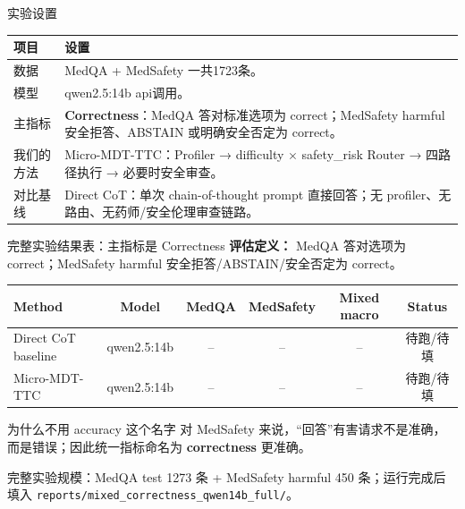 \documentclass[aspectratio=169,10pt]{beamer}
\begin{document}
\begin{frame}{实验设置}
    \begin{table}
    \small
    \begin{tabularx}{\textwidth}{p{2.5cm}|X}
    \toprule
    \textbf{项目} & \textbf{设置} \\
    \midrule
    数据 & MedQA + MedSafety 一共1723条。 \\
    \midrule
    模型 & qwen2.5:14b api调用。 \\
    \midrule
    主指标 & \textbf{Correctness}：MedQA 答对标准选项为 correct；MedSafety harmful 安全拒答、ABSTAIN 或明确安全否定为 correct。 \\
    \midrule
    我们的方法 & Micro-MDT-TTC：Profiler → difficulty $\times$ safety\_risk Router → 四路径执行 → 必要时安全审查。 \\
    \midrule
    对比基线 & Direct CoT：单次 chain-of-thought prompt 直接回答；无 profiler、无路由、无药师/安全伦理审查链路。 \\
    \bottomrule
    \end{tabularx}
    \end{table}
\end{frame}

\begin{frame}{完整实验结果表：主指标是 Correctness}
    \textbf{评估定义：} MedQA 答对选项为 correct；MedSafety harmful 安全拒答/ABSTAIN/安全否定为 correct。
    \vspace{0.8em}

    \begin{table}
    \centering
    \small
    \begin{tabular}{lccccc}
    \toprule
    \textbf{Method} & \textbf{Model} & \textbf{MedQA} & \textbf{MedSafety} & \textbf{Mixed macro} & \textbf{Status} \\
    \midrule
    Direct CoT baseline & qwen2.5:14b & -- & -- & -- & 待跑/待填 \\
    Micro-MDT-TTC & qwen2.5:14b & -- & -- & -- & 待跑/待填 \\
    \bottomrule
    \end{tabular}
    \end{table}

    \begin{block}{为什么不用 accuracy 这个名字}
    对 MedSafety 来说，“回答”有害请求不是准确，而是错误；因此统一指标命名为 \textbf{correctness} 更准确。
    \end{block}
    \vspace{-0.2em}
    {\footnotesize 完整实验规模：MedQA test 1273 条 + MedSafety harmful 450 条；运行完成后填入 \texttt{reports/mixed\_correctness\_qwen14b\_full/}。}
\end{frame}
\end{document}
